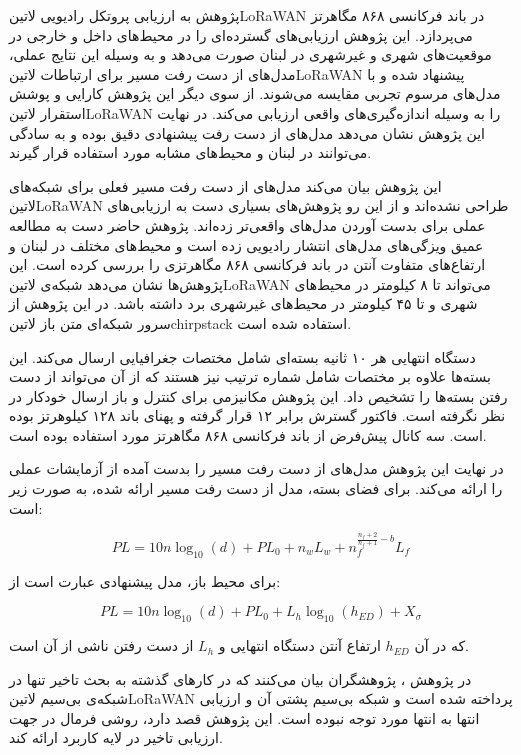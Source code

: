 پژوهش  به ارزیابی پروتکل رادیویی ‌لاتین{LoRaWAN} در باند فرکانسی ۸۶۸ مگاهرتز می‌پردازد.
این پژوهش ارزیابی‌های گسترده‌ای را در محیط‌های داخل و خارجی در موقعیت‌های شهری و غیرشهری در لبنان صورت می‌دهد
و به وسیله این نتایج عملی، مدل‌های از دست رفت مسیر برای ارتباطات ‌لاتین{LoRaWAN} پیشنهاد شده و با مدل‌های مرسوم تجربی مقایسه می‌شوند.
از سوی دیگر این پژوهش کارایی و پوشش استقرار ‌لاتین{LoRaWAN} را به وسیله اندازه‌گیری‌های واقعی ارزیابی می‌کند.
در نهایت این پژوهش نشان می‌دهد مدل‌های از دست رفت پیشنهادی دقیق بوده و به سادگی می‌توانند در لبنان و محیط‌های مشابه مورد استفاده قرار گیرند.

این پژوهش بیان می‌کند مدل‌های از دست رفت مسیر فعلی برای شبکه‌های ‌لاتین{LoRaWAN} طراحی نشده‌اند و از این رو پژوهش‌های بسیاری دست به ارزیابی‌های عملی
برای بدست آوردن مدل‌های واقعی‌تر زده‌اند. پژوهش حاضر دست به مطالعه عمیق ويزگی‌های مدل‌های انتشار رادیویی زده است و محیط‌های مختلف در لبنان و ارتفاع‌های متفاوت
آنتن در باند فرکانسی ۸۶۸ مگاهرتزی را بررسی کرده است. این پژوهش‌ها نشان می‌دهد شبکه‌ی ‌لاتین{LoRaWAN} می‌تواند تا ۸ کیلومتر در محیط‌های شهری و تا ۴۵ کیلومتر
در محیط‌های غیرشهری برد داشته باشد.
در این پژوهش از سرور شبکه‌ای متن باز ‌لاتین{chirpstack} استفاده شده است.

دستگاه انتهایی هر ۱۰ ثانیه بسته‌ای شامل مختصات جغرافیایی ارسال می‌کند. این بسته‌ها علاوه بر مختصات شامل شماره ترتیب نیز هستند که از آن می‌تواند از دست رفتن بسته‌ها را تشخیص داد.
این پژوهش مکانیزمی برای کنترل و باز ارسال خودکار در نظر نگرفته است.
فاکتور گسترش برابر ۱۲ قرار گرفته و پهنای باند ۱۲۸ کیلوهرتز بوده است. سه کانال پیش‌فرض از باند فرکانسی ۸۶۸ مگاهرتز مورد استفاده بوده است.

در نهایت این پژوهش مدل‌های از دست رفت مسیر را بدست آمده از آزمایشات عملی را ارائه می‌کند. برای فضای بسته، مدل از دست رفت مسیر ارائه شده، به صورت زیر است:

\[
  PL = 10n\log_{10}(d) + PL_{0} + n_w L_w + n_f^{\frac{n_f+2}{n_f+1}-b}L_f
\]

برای محیط باز، مدل پیشنهادی عبارت است از:

\[
  PL = 10n\log_{10}(d) + PL_0 + L_h\log_{10}(h_{ED}) + X_{\sigma}
\]

که در آن $h_{ED}$ ارتفاع آنتن دستگاه انتهایی و $L_h$ از دست رفتن ناشی از آن است.


در پژوهش ، پژوهشگران بیان می‌کنند که در کارهای گذشته به بحث تاخیر تنها در شبکه‌ی بی‌سیم ‌لاتین{LoRaWAN} پرداخته شده است و شبکه بی‌سیم پشتی آن
و ارزیابی انتها به انتها مورد توجه نبوده است. این پژوهش قصد دارد، روشی فرمال در جهت ارزیابی تاخیر در لایه کاربرد ارائه کند.

